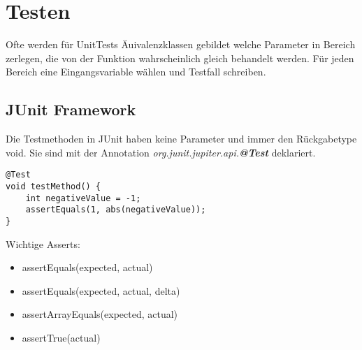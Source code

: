 \section{Testen}
Ofte werden für UnitTests Äuivalenzklassen gebildet welche Parameter in Bereich zerlegen, die von der Funktion wahrscheinlich gleich behandelt werden. Für jeden Bereich eine Eingangsvariable wählen und Testfall schreiben.

\subsection{JUnit Framework}
Die Testmethoden in JUnit haben keine Parameter und immer den Rückgabetype void. Sie sind mit der Annotation \textit{org.junit.jupiter.api.\textbf{@Test}} deklariert.

\begin{lstlisting}
@Test
void testMethod() {
	int negativeValue = -1;
	assertEquals(1, abs(negativeValue));	
}
\end{lstlisting}

Wichtige Asserts:
\begin{itemize}[nosep]
	\item assertEquals(expected, actual)
	\item assertEquals(expected, actual, delta)
	\item assertArrayEquals(expected, actual)
	\item assertTrue(actual)
\end{itemize}